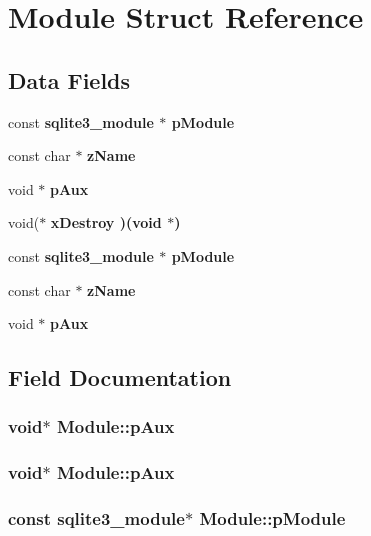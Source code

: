 \section{Module Struct Reference}
\label{structModule}
\subsection*{Data Fields}
\begin{CompactItemize}
\item 
const \bf{sqlite3\_\-module} $\ast$ \bf{p\-Module}
\item 
const char $\ast$ \bf{z\-Name}
\item 
void $\ast$ \bf{p\-Aux}
\item 
void($\ast$ \bf{x\-Destroy} )(void $\ast$)
\item 
const \bf{sqlite3\_\-module} $\ast$ \bf{p\-Module}
\item 
const char $\ast$ \bf{z\-Name}
\item 
void $\ast$ \bf{p\-Aux}
\end{CompactItemize}


\subsection{Field Documentation}
\subsubsection{\setlength{\rightskip}{0pt plus 5cm}void$\ast$ \bf{Module::p\-Aux}}\label{structModule_6108694ba114b6c70abdbdb04b2a562c}


\subsubsection{\setlength{\rightskip}{0pt plus 5cm}void$\ast$ \bf{Module::p\-Aux}}\label{structModule_6108694ba114b6c70abdbdb04b2a562c}


\subsubsection{\setlength{\rightskip}{0pt plus 5cm}const \bf{sqlite3\_\-module}$\ast$ \bf{Module::p\-Module}}\label{structModule_e86c20048a5af64b6e6307f5779b8bac}


